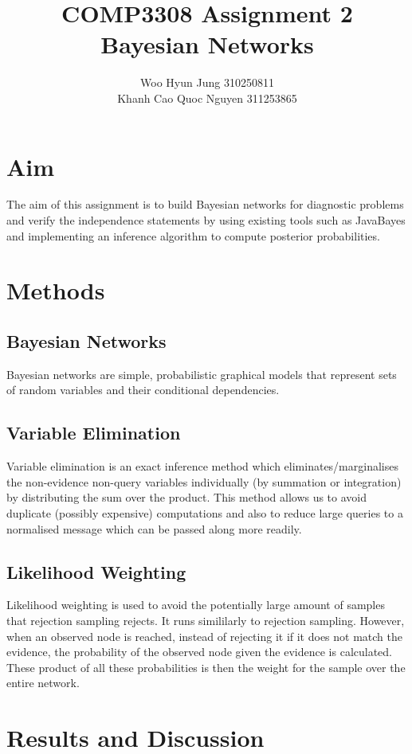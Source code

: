 \documentclass{article}
\title{COMP3308 Assignment 2 \\ Bayesian Networks}
\author{Woo Hyun Jung 310250811 \\  Khanh Cao Quoc Nguyen 311253865}
\date{}
\begin{document}
\maketitle
\thispagestyle{empty}
\newpage

\section{Aim}
The aim of this assignment is to build Bayesian networks for diagnostic problems and verify the independence statements by using existing tools such as JavaBayes and implementing an inference algorithm to compute posterior probabilities.

\section{Methods}
\subsection{Bayesian Networks}
Bayesian networks are simple, probabilistic graphical models that represent sets of random variables and their conditional dependencies.

\subsection{Variable Elimination}
Variable elimination is an exact inference method which eliminates/marginalises the non-evidence non-query variables individually (by summation or integration) by distributing the sum over the product. This method allows us to avoid duplicate (possibly expensive) computations and also to reduce large queries to a normalised message which can be passed along more readily.

\subsection{Likelihood Weighting}
Likelihood weighting is used to avoid the potentially large amount of samples that rejection sampling rejects. It runs simililarly to rejection sampling. However, when an observed node is reached, instead of rejecting it if it does not match the evidence, the probability of the observed node given the evidence is calculated. These product of all these probabilities is then the weight for the sample over the entire network. 

\section{Results and Discussion}
\end{document}

